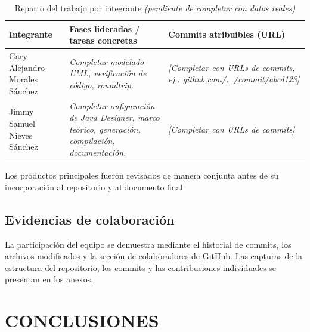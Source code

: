 \documentclass[10pt,a4paper,openany]{report}
\renewcommand{\arraystretch}{1.15}
\begin{document}
	\begin{table}[H]
		\centering
		\caption{Reparto del trabajo por integrante \textit{(pendiente de completar con datos reales)}}
		\label{tab:responsabilidades-equipo}
		\small
		\renewcommand{\arraystretch}{1.15}
		
		\begin{tabularx}{\textwidth}{|p{3.4cm}|p{4.6cm}|Y|}
			\hline
			\textbf{Integrante} &
			\textbf{Fases lideradas / tareas concretas} &
			\textbf{Commits atribuibles (URL)} \\
			\hline
			
			Gary Alejandro Morales Sánchez &
			\textit{Completar modelado UML, verificación de código,  roundtrip.} &
			\textit{[Completar con URLs de commits, ej.:
				github.com/.../commit/abcd123]} \\
			\hline
			
			Jimmy Samuel Nieves Sánchez &
			\textit{Completar onfiguración de Java Designer, marco teórico, generación, compilación, documentación.} &
			\textit{[Completar con URLs de commits]} \\
			\hline
		\end{tabularx}
	\end{table}
	
	Los productos principales fueron revisados de manera conjunta antes de
	su incorporación al repositorio y al documento final.
	
	\section{Evidencias de colaboración}
	
	La participación del equipo se demuestra mediante el historial de
	commits, los archivos modificados y la sección de colaboradores de
	GitHub. Las capturas de la estructura del repositorio, los commits y las
	contribuciones individuales se presentan en los anexos.
	
	
	
	\chapter{CONCLUSIONES}
	
\end{document}

